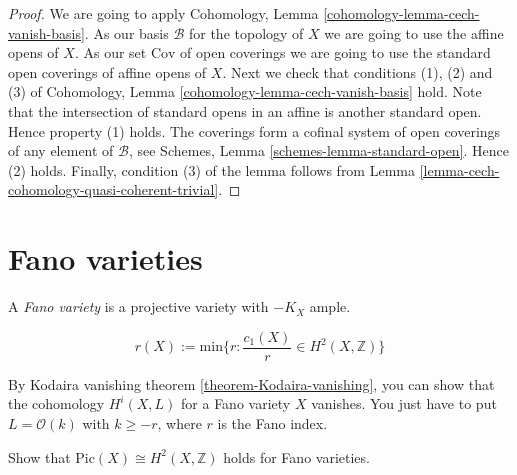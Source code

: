 \begin{proof}
We are going to apply
Cohomology, Lemma \ref{cohomology-lemma-cech-vanish-basis}.
As our basis $\mathcal{B}$ for the topology of $X$ we are going to use
the affine opens of $X$.
As our set $\text{Cov}$ of open coverings we are going to use the standard
open coverings of affine opens of $X$.
Next we check that conditions (1), (2) and (3) of
Cohomology, Lemma \ref{cohomology-lemma-cech-vanish-basis}
hold. Note that the intersection of standard opens in an affine is
another standard open. Hence property (1) holds.
The coverings form a cofinal system of open coverings of any element
of $\mathcal{B}$, see
Schemes, Lemma \ref{schemes-lemma-standard-open}.
Hence (2) holds.
Finally, condition (3) of the lemma follows from
Lemma \ref{lemma-cech-cohomology-quasi-coherent-trivial}.
\end{proof}

\section{Fano varieties}
\label{section-Fano-varieties}

\begin{definition}
\label{definition-Fano-variety}
A {\it Fano variety} is a projective variety with $-K_X$ ample.
\end{definition}

\begin{definition}
\label{definition-Fano-index}
$$
r(X):=\text{min}\{r:\frac{c_1(X)}{r}\in H^{2}(X,\mathbb{Z})\}
$$
\end{definition}

\begin{exercise}
\label{exercise-Fano-vanishing-higher-cohomology}
By Kodaira vanishing theorem \ref{theorem-Kodaira-vanishing}, 
you can show that the cohomology $H^{i}(X,L)$ for
a Fano variety $X$ vanishes. You just have to put $L=\mathcal{O}(k)$ with $k\geq
-r$, where $r$ is the Fano index.
\end{exercise}

\begin{exercise}
\label{exercise-Pic-H2-Fano}
Show that  $\text{Pic}(X)\cong H^{2}(X,\mathbb{Z})$ holds for Fano varieties.
\end{exercise}






